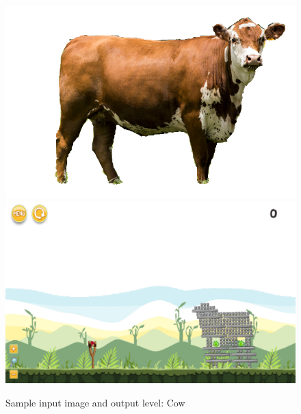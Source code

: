 \documentclass{dalthesis}
\begin{document}
\begin{figure}
	\caption{Sample input image and output level: Cow}
  \includegraphics[width=\textwidth,height=\textheight,keepaspectratio]{levels/pictures/animals/cow.jpg}
  \includegraphics[width=\textwidth,height=\textheight,keepaspectratio]{levels/screenshots/animals/cow.png}
\end{figure}
\end{document}
